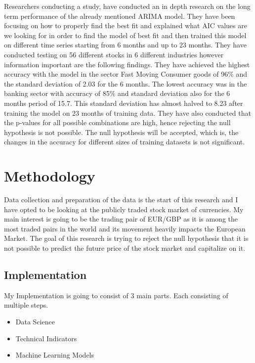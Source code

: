 \documentclass{imc-inf}
\begin{document}
	
	
	Researchers conducting a study, \cite{arima} have conducted an in depth research on the long term performance of the already mentioned ARIMA model.
	They have been focusing on how to properly find the best fit and explained what AIC values are we looking for in order to find the model of best fit
	and then trained this model on different time series starting from 6 months and up to 23 months. They have conducted testing on 56 different stocks 
	in 6 different industries however information important are the following findings. They have achieved the highest accuracy with the model in the 
	sector Fast Moving Consumer goods of 96\% and the standard deviation of 2.03 for the 6 months. The lowest accuracy was in the banking sector with
	accuracy of 85\% and standard deviation also for the 6 months period of 15.7. This standard deviation has almost halved to 8.23 after training
	the model on 23 months of training data. They have also conducted that the p-values for all possible combinations are high, hence rejecting 
	the null hypothesis is not possible. The null hypothesis will be accepted, which is, the changes in the accuracy for different sizes of training
	datasets is not significant.
	
	\chapter{Methodology}\label{chap:methodology}
	Data collection and preparation of the data is the start of this research and I have opted to be looking at the publicly traded stock market of currencies.
	My main interest is going to be the trading pair of EUR/GBP as it is among the most traded pairs in the world and its movement heavily impacts the European Market.
	The goal of this research is trying to reject the null hypothesis that it is not possible to predict the future price of the stock market and capitalize on it. 
	
	\section{Implementation}
	My Implementation is going to consist of 3 main parts. Each consisting of multiple steps.
	\begin{itemize}
		\item Data Science
		\item Technical Indicators
		\item Machine Learning Models
	\end{itemize}
	
\end{document}
